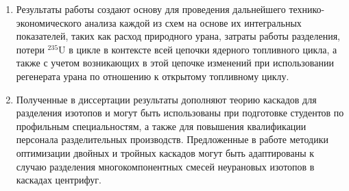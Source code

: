 \begin{enumerate}[label=\Roman*.]
\item Результаты работы создают основу для проведения дальнейшего технико-экономического анализа каждой из схем на основе их интегральных показателей, таких как расход природного урана, затраты работы разделения, потери $^{235}$U в цикле в контексте всей цепочки ядерного топливного цикла, а также с учетом возникающих в этой цепочке изменений при использовании регенерата урана по отношению к открытому топливному циклу.  

\item Полученные в диссертации результаты дополняют теорию каскадов для разделения изотопов и могут быть использованы при подготовке студентов по профильным специальностям, а также для повышения квалификации персонала разделительных производств. Предложенные в работе методики оптимизации двойных и тройных каскадов могут быть адаптированы к случаю разделения многокомпонентных смесей неурановых изотопов в каскадах центрифуг.

\end{enumerate}
